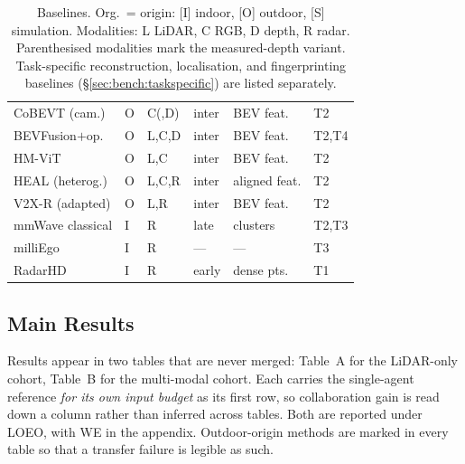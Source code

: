 \begin{table}[t]
\begin{tabular}{@{}llllll@{}}
CoBEVT (cam.)      & O & C(,D) & inter & BEV feat.  & T2 \\
BEVFusion${+}$op.  & O & L,C,D & inter & BEV feat.  & T2,T4 \\
HM-ViT             & O & L,C   & inter & BEV feat.  & T2 \\
HEAL (heterog.)    & O & L,C,R & inter & aligned feat. & T2 \\
V2X-R (adapted)    & O & L,R   & inter & BEV feat.  & T2 \\
mmWave classical   & I & R     & late  & clusters   & T2,T3 \\
milliEgo           & I & R     & ---   & ---        & T3 \\
RadarHD            & I & R     & early & dense pts. & T1 \\
\bottomrule
\end{tabular}
\caption{Baselines. Org.\ = origin: [I] indoor, [O] outdoor, [S] simulation.
Modalities: L LiDAR, C RGB, D depth, R radar. Parenthesised modalities mark the
measured-depth variant. Task-specific reconstruction, localisation, and
fingerprinting baselines (\S\ref{sec:bench:taskspecific}) are listed
separately.}
\label{tab:baselines}
\end{table}


\subsection{Main Results}
\label{sec:bench:results}

Results appear in two tables that are never merged: Table~A for the LiDAR-only
cohort, Table~B for the multi-modal cohort. Each carries the single-agent
reference \emph{for its own input budget} as its first row, so collaboration
gain is read down a column rather than inferred across tables. Both are
reported under LOEO, with WE in the appendix. Outdoor-origin methods are marked
in every table so that a transfer failure is legible as such.



